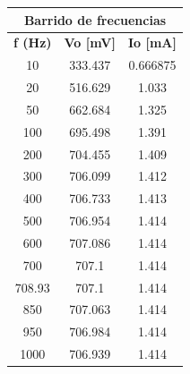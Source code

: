 \documentclass[conference]{IEEEtran}
\begin{document}
	\begin{table}[]
		\centering
		\begin{tabular}{|ccc|}
			\hline
			\multicolumn{3}{|c|}{\textbf{Barrido   de frecuencias}}                                                  \\ \hline
			\multicolumn{1}{|c|}{\textbf{f (Hz)}} & \multicolumn{1}{c|}{\textbf{Vo {[}mV{]}}} & \textbf{Io {[}mA{]}} \\ \hline
			\multicolumn{1}{|c|}{10}              & \multicolumn{1}{c|}{333.437}              & 0.666875             \\ \hline
			\multicolumn{1}{|c|}{20}              & \multicolumn{1}{c|}{516.629}              & 1.033                \\ \hline
			\multicolumn{1}{|c|}{50}              & \multicolumn{1}{c|}{662.684}              & 1.325                \\ \hline
			\multicolumn{1}{|c|}{100}             & \multicolumn{1}{c|}{695.498}              & 1.391                \\ \hline
			\multicolumn{1}{|c|}{200}             & \multicolumn{1}{c|}{704.455}              & 1.409                \\ \hline
			\multicolumn{1}{|c|}{300}             & \multicolumn{1}{c|}{706.099}              & 1.412                \\ \hline
			\multicolumn{1}{|c|}{400}             & \multicolumn{1}{c|}{706.733}              & 1.413                \\ \hline
			\multicolumn{1}{|c|}{500}             & \multicolumn{1}{c|}{706.954}              & 1.414                \\ \hline
			\multicolumn{1}{|c|}{600}             & \multicolumn{1}{c|}{707.086}              & 1.414                \\ \hline
			\multicolumn{1}{|c|}{700}             & \multicolumn{1}{c|}{707.1}                & 1.414                \\ \hline
			\multicolumn{1}{|c|}{708.93}          & \multicolumn{1}{c|}{707.1}                & 1.414                \\ \hline
			\multicolumn{1}{|c|}{850}             & \multicolumn{1}{c|}{707.063}              & 1.414                \\ \hline
			\multicolumn{1}{|c|}{950}             & \multicolumn{1}{c|}{706.984}              & 1.414                \\ \hline
			\multicolumn{1}{|c|}{1000}            & \multicolumn{1}{c|}{706.939}              & 1.414                \\ \hline

\end{tabular}
\end{table}
\end{document}
